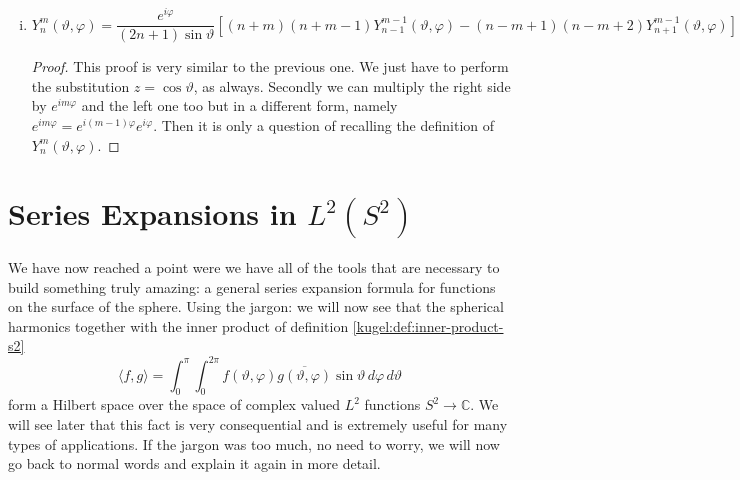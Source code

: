 \begin{enumerate}[(i)]
  \begin{proof}
    Now we can consider eq.\eqref{}, and multiply it by $e^{im\varphi}$. After the usual substitution $z=\cos \vartheta$, we have 
    \begin{align*}
      \sin \vartheta P^m_n(\cos \vartheta)e^{im\varphi} &= \dfrac{e^{im\varphi}}{2n+1}\left[ P^{m+1}_{n+1}(\cos \vartheta) - P^{m+1}_{n-1}(\cos \vartheta)\right] \\
      &= \dfrac{e^{-i\varphi}}{2n+1}\left[ P^{m+1}_{n+1}(\cos \vartheta)e^{i(m+1)\varphi} - P^{m+1}_{n-1}(\cos \vartheta)e^{i(m+1)\varphi}\right] \\
    \end{align*}
    A few manipulations later, we will obtain
    \begin{equation*}
      Y^m_n(\vartheta, \varphi) = \frac{e^{-i\varphi}}{(2n+1)\sin \vartheta} \left[ Y^{m+1}_{n+1}(\vartheta, \varphi)-Y^{m+1}_{n-1}(\vartheta, \varphi) \right]
    \end{equation*}
  \end{proof}
  \item $Y^m_n(\vartheta, \varphi) = \dfrac{e^{i\varphi}}{(2n+1)\sin \vartheta} \left[ (n+m)(n+m-1)Y^{m-1}_{n-1}(\vartheta, \varphi) - (n-m+1)(n-m+2)Y^{m-1}_{n+1}(\vartheta, \varphi) \right]$
  \begin{proof}
    This proof is very similar to the previous one. We just have to perform the substitution $z = \cos \vartheta$, as always. Secondly we can multiply the right side by $e^{im\varphi}$ and the left one too but in a different form, namely $e^{im\varphi}=e^{i(m-1)\varphi}e^{i\varphi}$. Then it is only a question of recalling the definition of $Y^m_n(\vartheta, \varphi)$.
  \end{proof}
\end{enumerate}

\section{Series Expansions in $L^2(S^2)$}

We have now reached a point were we have all of the tools that are necessary to
build something truly amazing: a general series expansion formula for functions
on the surface of the sphere. Using the jargon: we will now see that the
spherical harmonics together with the inner product of definition
\ref{kugel:def:inner-product-s2}
\begin{equation*}
  \langle f, g \rangle
  = \int_{0}^\pi \int_0^{2\pi}
    f(\vartheta, \varphi) \overline{g(\vartheta, \varphi)}
    \sin \vartheta \, d\varphi \, d\vartheta
\end{equation*}
form a Hilbert space over the space of complex valued $L^2$ functions $S^2 \to
\mathbb{C}$. We will see later that this fact is very consequential and is
extremely useful for many types of applications. If the jargon was too much, no
need to worry, we will now go back to normal words and explain it again in more
detail.

